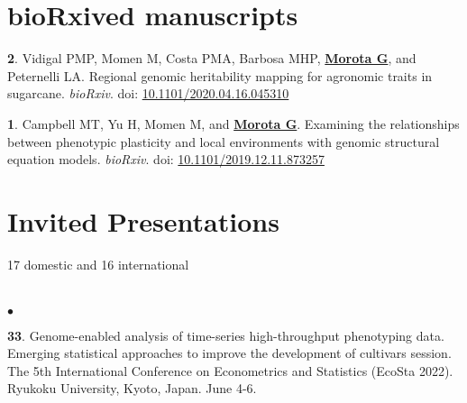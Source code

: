 \documentclass[margin,line,10pt]{res}
\newenvironment{list1}{
  \begin{list}{\ding{113}}{%
      \setlength{\itemsep}{0in}
      \setlength{\parsep}{0in} \setlength{\parskip}{0in}
      \setlength{\topsep}{0in} \setlength{\partopsep}{0in} 
      \setlength{\leftmargin}{0.17in}}}{\end{list}}
\newenvironment{list2}{
  \begin{list}{$\bullet$}{%
      \setlength{\itemsep}{0in}
      \setlength{\parsep}{0in} \setlength{\parskip}{0in}
      \setlength{\topsep}{0in} \setlength{\partopsep}{0in} 
      \setlength{\leftmargin}{0.2in}}}{\end{list}}
\begin{document}
\begin{resume}
\begin{list1}
\end{list1}





\vspace{1.0cm}
\section{\sc bioRxived manuscripts}

\begin{list1}

  \item [{\bf 2}.] Vidigal PMP, Momen M, Costa PMA, Barbosa MHP, \textbf{\underline{Morota G}}, and Peternelli LA. Regional genomic heritability mapping for agronomic traits in sugarcane. \emph{bioRxiv}. doi: \textcolor{blue}{\href{https://doi.org/10.1101/2020.04.16.045310}{10.1101/2020.04.16.045310}}

  \vspace{0.5cm}

\item [{\bf 1}.] Campbell MT, Yu H, Momen M, and \textbf{\underline{Morota G}}. Examining the relationships between phenotypic plasticity and local environments with genomic structural equation models. \emph{bioRxiv}. doi: \textcolor{blue}{\href{https://doi.org/10.1101/2019.12.11.873257}{10.1101/2019.12.11.873257}}
  

\end{list1}




\vspace{1.0cm}
\section{\sc Invited Presentations}
\vspace{0.5cm}
17 domestic and 16 international \\
\noindent




\section{}
\begin{list2}
  
\item [{\bf 33}.] Genome-enabled analysis of time-series high-throughput phenotyping data. Emerging statistical approaches to improve the development of cultivars session. The 5th International Conference on Econometrics and Statistics (EcoSta 2022). Ryukoku University, Kyoto, Japan. June 4-6.


\end{list2}
\end{resume}
\end{document}
